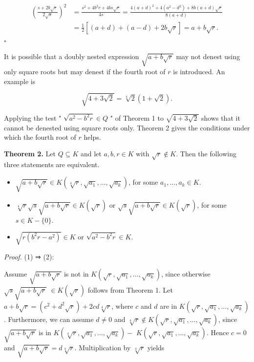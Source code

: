 \documentclass[11pt,letterpaper]{article}
\begin{document}
\[
\begin{aligned}
\left(\frac{s+2 b \sqrt{r}}{2 \sqrt{s}}\right)^{2} & =\frac{s^{2}+4 b^{2} r+4 b s \sqrt{r}}{4 s}=\frac{4(a+d)^{2}+4\left(a^{2}-d^{2}\right)+8 b(a+d) \sqrt{r}}{8(a+d)} \\
& =\frac{1}{2}[(a+d)+(a-d)+2 b \sqrt{r}]=a+b \sqrt{r} .
\end{aligned}
\]
\hfill$\square$

It is possible that a doubly nested expression $\sqrt{a+b \sqrt{r}}$ may not denest using only square roots but may denest if the fourth root of $r$ is introduced. An example is

\[
\sqrt{4+3 \sqrt{2}}=\sqrt[4]{2}(1+\sqrt{2}) .
\]

Applying the test " $\sqrt{a^{2}-b^{2} r} \in Q$ " of Theorem 1 to $\sqrt{4+3 \sqrt{2}}$ shows that it cannot be denested using square roots only. Theorem 2 gives the conditions under which the fourth root of $r$ helps.

\noindent\textbf{Theorem 2.} Let $Q \subseteq K$ and let $a, b, r \in K$ with $\sqrt{r} \notin K$. Then the following three statements are equivalent.

\begin{itemize}
  \item[(1)] $\sqrt{a+b \sqrt{r}} \in K\left(\sqrt[4]{r}, \sqrt{a_{1}}, \ldots, \sqrt{a_{k}}\right)$, for some $a_{1}, \ldots, a_{k} \in K$.
  \item[(2)] $\sqrt[4]{r} \sqrt{s} \sqrt{a+b \sqrt{r}} \in K(\sqrt{r})$ or $\sqrt{s} \sqrt{a+b \sqrt{r}} \in K(\sqrt{r})$, for some $s \in K-\{0\}$.
  \item[(3)] $\sqrt{r\left(b^{2} r-a^{2}\right)} \in K$ or $\sqrt{a^{2}-b^{2} r} \in K$.
\end{itemize}

\noindent\textit{Proof.} (1) ⇒ (2):

Assume $\sqrt{a+b \sqrt{r}}$ is not in $K\left(\sqrt{r}, \sqrt{a_{1}}, \ldots, \sqrt{a_{k}}\right)$, since otherwise $\sqrt{s} \sqrt{a+b \sqrt{r}}$ $\in K(\sqrt{r})$ follows from Theorem 1. Let $a+b \sqrt{r}=\left(c^{2}+d^{2} \sqrt{r}\right)+2 c d \sqrt[4]{r}$, where $c$ and $d$ are in $K\left(\sqrt{r}, \sqrt{a_{1}}, \ldots, \sqrt{a_{k}}\right)$. Furthermore, we can assume $d \neq 0$ and $\sqrt[4]{r} \notin K\left(\sqrt{r}, \sqrt{a_{1}}, \ldots, \sqrt{a_{k}}\right)$, since $\sqrt{a+b \sqrt{r}}$ is in $K\left(\sqrt[4]{r}, \sqrt{a_{1}}, \ldots, \sqrt{a_{k}}\right)-$ $K\left(\sqrt{r}, \sqrt{a_{1}}, \ldots, \sqrt{a_{k}}\right)$. Hence $c=0$ and $\sqrt{a+b \sqrt{r}}=d \sqrt[4]{r}$. Multiplication by $\sqrt[4]{r}$ yields
\end{document}
